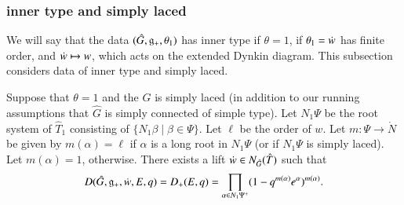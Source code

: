 \subsubsection{inner type and simply laced}  We will say that the data $(\hat G,{\mathfrak g}_+,\theta_1)$ has inner type if $\theta=1$,
if $\theta_1 = \dot w$ has finite order, and $\dot w\mapsto w$, which acts on the extended Dynkin diagram.
This subsection considers data of inner type and simply laced.

\begin{lemma}\label{lemma:inner} 
Suppose that $\theta=1$ and the $\hat G$ is simply laced (in addition to our running assumptions that $\hat G$ is simply connected
of simple type).  Let $N_1\Psi$ be the root system of $\hat T_1$ consisting of $\{N_1\beta\mid \beta\in \Psi\}$. Let $\ell$ be the order of $w$.
Let $m:\Psi\to \ring{N}$ be given by $m(\alpha)=\ell$ if $\alpha$ is a long root in $N_1\Psi$ (or if  $N_1\Psi$ is simply laced).
Let $m(\alpha) = 1$, otherwise.
There exists a lift $\dot w\in N_{\hat G}(\hat T)$ such that
\[
D(\hat G,{\mathfrak g}_+,\dot w,E,q) = D_+(E,q) = \prod_{\alpha\in N_1\Psi^+} (1- q^{m(\alpha)} e^\alpha)^{m(\alpha)}.
\]
\end{lemma}

